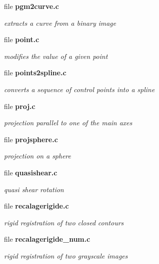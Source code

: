 \begin{CompactItemize}
\item 
file \bf{pgm2curve.c}
\begin{CompactList}\small\item\em extracts a curve from a binary image \item\end{CompactList}

\item 
file \bf{point.c}
\begin{CompactList}\small\item\em modifies the value of a given point \item\end{CompactList}

\item 
file \bf{points2spline.c}
\begin{CompactList}\small\item\em converts a sequence of control points into a spline \item\end{CompactList}

\item 
file \bf{proj.c}
\begin{CompactList}\small\item\em projection parallel to one of the main axes \item\end{CompactList}

\item 
file \bf{projsphere.c}
\begin{CompactList}\small\item\em projection on a sphere \item\end{CompactList}

\item 
file \bf{quasishear.c}
\begin{CompactList}\small\item\em quasi shear rotation \item\end{CompactList}

\item 
file \bf{recalagerigide.c}
\begin{CompactList}\small\item\em rigid registration of two closed contours \item\end{CompactList}

\item 
file \bf{recalagerigide\_\-num.c}
\begin{CompactList}\small\item\em rigid registration of two grayscale images \item\end{CompactList}


\end{CompactItemize}
